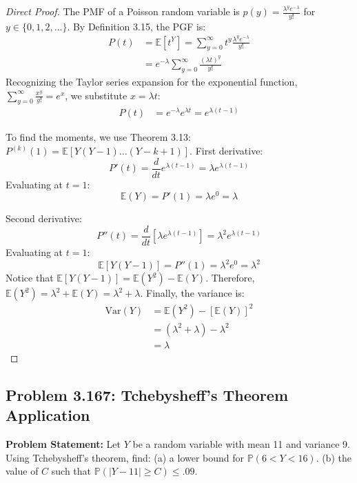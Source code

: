 \documentclass[11pt, a4paper]{article}
\theoremstyle{definition}
\theoremstyle{remark}
\newcommand{\E}{\mathbb{E}}
\newcommand{\Var}{\mathrm{Var}}
\newcommand{\Prob}{\mathbb{P}}
\begin{document}
\begin{proof}[Direct Proof]
The PMF of a Poisson random variable is $p(y) = \frac{\lambda^y e^{-\lambda}}{y!}$ for $y \in \{0, 1, 2, \dots\}$.
By Definition 3.15, the PGF is:
\begin{align*}
    P(t) &= \E[t^Y] = \sum_{y=0}^{\infty} t^y \frac{\lambda^y e^{-\lambda}}{y!} \\
         &= e^{-\lambda} \sum_{y=0}^{\infty} \frac{(\lambda t)^y}{y!}
\end{align*}
Recognizing the Taylor series expansion for the exponential function, $\sum_{y=0}^\infty \frac{x^y}{y!} = e^x$, we substitute $x = \lambda t$:
\begin{align*}
    P(t) &= e^{-\lambda} e^{\lambda t} = e^{\lambda(t - 1)}
\end{align*}

To find the moments, we use Theorem 3.13: $P^{(k)}(1) = \E[Y(Y-1)\dots(Y-k+1)]$.
First derivative:
\[ P'(t) = \frac{d}{dt} e^{\lambda(t-1)} = \lambda e^{\lambda(t-1)} \]
Evaluating at $t=1$:
\[ \E(Y) = P'(1) = \lambda e^0 = \lambda \]

Second derivative:
\[ P''(t) = \frac{d}{dt} \left[ \lambda e^{\lambda(t-1)} \right] = \lambda^2 e^{\lambda(t-1)} \]
Evaluating at $t=1$:
\[ \E[Y(Y-1)] = P''(1) = \lambda^2 e^0 = \lambda^2 \]
Notice that $\E[Y(Y-1)] = \E(Y^2) - \E(Y)$. Therefore, $\E(Y^2) = \lambda^2 + \E(Y) = \lambda^2 + \lambda$.
Finally, the variance is:
\begin{align*}
    \Var(Y) &= \E(Y^2) - [\E(Y)]^2 \\
            &= (\lambda^2 + \lambda) - \lambda^2 \\
            &= \lambda
\end{align*}
\end{proof}

\subsection{Problem 3.167: Tchebysheff's Theorem Application}
\textbf{Problem Statement:} Let $Y$ be a random variable with mean 11 and variance 9. Using Tchebysheff's theorem, find:
(a) a lower bound for $\Prob(6 < Y < 16)$.
(b) the value of $C$ such that $\Prob(|Y - 11| \ge C) \le .09$.
\end{document}
